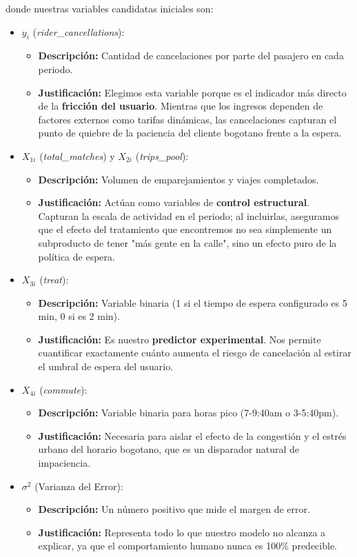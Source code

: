\documentclass[11pt,a4paper]{article}
\begin{document}
donde nuestras variables candidatas iniciales son:
\begin{itemize}
    \item $y_i$ (\textit{rider\_cancellations}):
    \begin{itemize}
        \item \textbf{Descripción:} Cantidad de cancelaciones por parte del pasajero en cada periodo.
        \item \textbf{Justificación:} Elegimos esta variable porque es el indicador más directo de la \textbf{fricción del usuario}. Mientras que los ingresos dependen de factores externos como tarifas dinámicas, las cancelaciones capturan el punto de quiebre de la paciencia del cliente bogotano frente a la espera.
    \end{itemize}
    \item $X_{1i}$ (\textit{total\_matches}) y $X_{2i}$ (\textit{trips\_pool}):
    \begin{itemize}
        \item \textbf{Descripción:} Volumen de emparejamientos y viajes completados.
        \item \textbf{Justificación:} Actúan como variables de \textbf{control estructural}. Capturan la escala de actividad en el periodo; al incluirlas, aseguramos que el efecto del tratamiento que encontremos no sea simplemente un subproducto de tener "más gente en la calle", sino un efecto puro de la política de espera.
    \end{itemize}
    \item $X_{3i}$ (\textit{treat}):
    \begin{itemize}
        \item \textbf{Descripción:} Variable binaria (1 si el tiempo de espera configurado es 5 min, 0 si es 2 min).
        \item \textbf{Justificación:} Es nuestro \textbf{predictor experimental}. Nos permite cuantificar exactamente cuánto aumenta el riesgo de cancelación al estirar el umbral de espera del usuario.
    \end{itemize}
    \item $X_{4i}$ (\textit{commute}):
    \begin{itemize}
        \item \textbf{Descripción:} Variable binaria para horas pico (7-9:40am o 3-5:40pm).
        \item \textbf{Justificación:} Necesaria para aislar el efecto de la congestión y el estrés urbano del horario bogotano, que es un disparador natural de impaciencia.
    \end{itemize}
    \item $\sigma^2$ (Varianza del Error):
    \begin{itemize}
        \item \textbf{Descripción:} Un número positivo que mide el margen de error.
        \item \textbf{Justificación:} Representa todo lo que nuestro modelo no alcanza a explicar, ya que el comportamiento humano nunca es 100\% predecible.
    \end{itemize}
\end{itemize}
\end{document}
